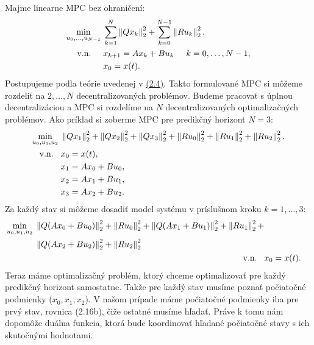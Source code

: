 Majme linearne MPC bez ohraničení:
\label{math:2.14}
\begin{subequations}
	\begin{align}
		\displaystyle \min_{u_0,...,u_{N-1}} \hspace{0.1cm} & 
		\sum_{k=1}^{N}\left\lVert Qx_k\right\rVert^{2}_{2}+\sum_{k=0}^{N-1}\left\lVert Ru_k\right\rVert^{2}_{2},\\
		\textrm{v.n.} \hspace{0.5cm} & x_{k+1} = Ax_{k}+Bu_{k}\hspace{0.5cm} k=0,\dots,N-1,\\
		& x_{0} = x(t).
	\end{align}
\end{subequations}
Postupujeme podla teórie uvedenej v \hyperref[subse:ADMM]{(2.4)}. Takto formulované MPC si môžeme rozdeliť na $2,\dots,N$ decentralizovaných problémov. Budeme pracovať s úplnou decentralizáciou a MPC si rozdelíme na $N$ decentralizovaných optimalizačných problémov.
\label{math:ADMM_MPC}
Ako príklad si zoberme MPC pre predikčný horizont $N = 3$:
\begin{subequations}
	\begin{align}
		\displaystyle\min_{u_0,u_1,u_2}\hspace{0.1cm}&\left\lVert Qx_1\right\rVert^{2}_{2}+\left\lVert Qx_2\right\rVert^{2}_{2}+\left\lVert Qx_3\right\rVert^{2}_{2}+\left\lVert Ru_0\right\rVert^{2}_{2}+\left\lVert Ru_1\right\rVert^{2}_{2}+\left\lVert Ru_2\right\rVert^{2}_{2},\\
		\textrm{v.n.} \hspace{0.3cm}& x_{0} = x(t),\\
		&x_{1} = Ax_{0}+Bu_{0},\\
		&x_{2} = Ax_{1}+Bu_{1},\\
		&x_{3} = Ax_{2}+Bu_{2}.
	\end{align}
\end{subequations}
Za každý stav si môžeme dosadiť model systému v príslušnom kroku $k=1,\dots,3$:
\begin{subequations}
	\begin{align}	
	\begin{split}			
			\displaystyle\min_{u_0,u_1,u_2}\hspace{0.1cm}&\left\lVert Q(Ax_{0}+Bu_{0})\right\rVert^{2}_{2}+\left\lVert Ru_0\right\rVert^{2}_{2}+\left\lVert Q(Ax_{1}+Bu_{1})\right\rVert^{2}_{2}+\left\lVert Ru_1\right\rVert^{2}_{2}+\\
			&\left\lVert Q(Ax_{2}+Bu_{2})\right\rVert^{2}_{2}+\left\lVert Ru_2\right\rVert^{2}_{2}
	\end{split}\\
	\textrm{v.n.} \hspace{0.3cm}& x_{0} = x(t).
	\end{align}
\end{subequations}
Teraz máme optimalizačný problém, ktorý chceme optimalizovať pre každý predikčný horizont samostatne. Takže pre každý stav musíme poznať počiatočné podmienky ($x_0,x_1,x_2$). V našom prípade máme počiatočné podmienky iba pre prvý stav, rovnica (2.16b), čiže ostatné musíme hľadať. Práve k tomu nám dopomôže duálna funkcia, ktorá bude koordinovať hľadané počiatočné stavy s ich skutočnými hodnotami. 

